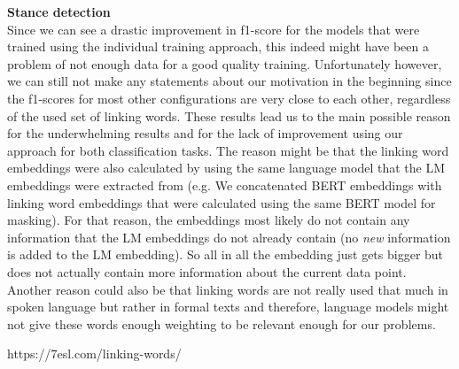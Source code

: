 \textbf{Stance detection} \\
Since we can see a drastic improvement in f1-score for the models that were trained using the individual training approach, this indeed might have been a problem of not enough data for a good quality training. Unfortunately however, we can still not make any statements about our motivation in the beginning since the f1-scores for most other configurations are very close to each other, regardless of the used set of linking words. These results lead us to the main possible reason for the underwhelming results and for the lack of improvement using our approach for both classification tasks. The reason might be that the linking word embeddings were also calculated by using the same language model that the LM embeddings were extracted from (e.g. We concatenated BERT embeddings with linking word embeddings that were calculated using the same BERT model for masking). For that reason, the embeddings most likely do not contain any information that the LM embeddings do not already contain (no \textit{new} information is added to the LM embedding). So all in all the embedding just gets bigger but does not actually contain more information about the current data point. Another reason could also be that linking words are not really used that much in spoken language but rather in formal texts and therefore, language models might not give these words enough weighting to be relevant enough for our problems.


https://7esl.com/linking-words/